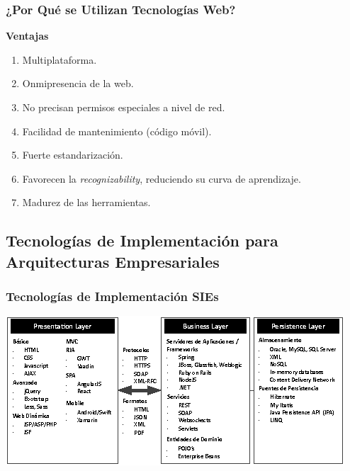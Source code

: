 \documentclass[handout,a4paper,t,xcolor=pst,dvips,colortheme]{beamer}
\begin{document}
\begin{frame}[c]
	\frametitle{¿Por Qué se Utilizan Tecnologías Web?}
    \centering \textbf{Ventajas} \\
    \begin{enumerate}
        \item<2-> Multiplataforma.
        \item<3-> Onmipresencia de la web.
        \item<4-> No precisan permisos especiales a nivel de red.
        \item<5-> Facilidad de mantenimiento (código móvil).
        \item<6-> Fuerte estandarización.
        \item<7-> Favorecen la \emph{recognizability}, reduciendo su curva de aprendizaje.
        \item<8-> Madurez de las herramientas.
    \end{enumerate}
\end{frame}

\subsection[Tecnologías SIE]{Tecnologías de Implementación para Arquitecturas Empresariales}

\begin{frame}[c]
	\frametitle{Tecnologías de Implementación SIEs}
	\begin{center}
        \includegraphics[width=\linewidth,keepaspectratio=true]{images/enterpriseLayers/technologies.eps}
	\end{center}
\end{frame}
\end{document}
